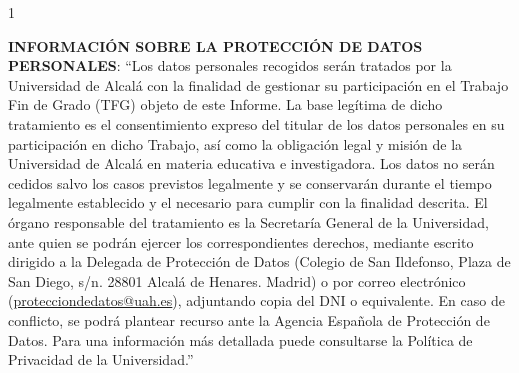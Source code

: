 %

\begin{spacing}{1}
  {\scriptsize \noindent \textbf{INFORMACIÓN SOBRE LA PROTECCIÓN DE DATOS PERSONALES}:
``Los datos personales recogidos serán tratados por la Universidad de Alcalá con la finalidad de gestionar su participación en el Trabajo Fin de Grado (TFG) objeto de este Informe. La base legítima de dicho tratamiento es el consentimiento expreso del titular de los datos personales en su participación en dicho Trabajo, así como la obligación legal y misión de la Universidad de Alcalá en materia educativa e investigadora. Los datos no serán cedidos salvo los casos previstos legalmente y se conservarán durante el tiempo legalmente establecido y el necesario para cumplir con la finalidad descrita. El órgano responsable del tratamiento es la Secretaría General de la Universidad, ante quien se podrán ejercer los correspondientes derechos, mediante escrito dirigido a la Delegada de Protección de Datos (Colegio de San Ildefonso, Plaza de San Diego, s/n. 28801 Alcalá de Henares. Madrid) o por correo electrónico (\href{mailto:protecciondedatos@uah.es}{protecciondedatos@uah.es}), adjuntando copia del DNI o equivalente. En caso de conflicto, se podrá plantear recurso ante la Agencia Española de Protección de Datos. Para una información más detallada puede consultarse la Política de Privacidad de la Universidad.''\par}
\end{spacing}
